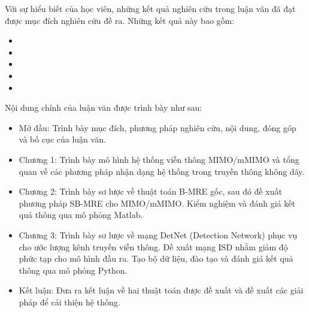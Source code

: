 
Với sự hiểu biết của học viên, những kết quả nghiên cứu trong luận văn đã đạt được mục đích nghiên cứu đề ra. Những kết quả này bao gồm:

\renewcommand{\labelitemi}{$-$}
\begin{itemize}
	\item 
	\item 
	\item 
	\item
	\item 
\end{itemize} 

\vspace{0.5cm}

Nội dung chính của luận văn được trình bày như sau:

\renewcommand{\labelitemi}{$-$}
\begin{itemize}
	\item Mở đầu: Trình bày mục đích, phương pháp nghiên cứu, nội dung, đóng góp và bố cục của luận văn.
	\item Chương 1: Trình bày mô hình hệ thống viễn thông MIMO/mMIMO và tổng quan về các phương pháp nhận dạng hệ thống trong truyền thông không dây.
	\item Chương 2: Trình bày sơ lược về thuật toán B-MRE gốc, sau đó đề xuất phương pháp SB-MRE cho MIMO/mMIMO. Kiểm nghiệm và đánh giá kết quả thông qua mô phỏng Matlab.
	\item Chương 3: Trình bày sơ lược về mạng DetNet (Detection Network) phục vụ cho ước lượng kênh truyền viễn thông. Đề xuất mạng ISD nhằm giảm độ phức tạp cho mô hình đầu ra. Tạo bộ dữ liệu, đào tạo và đánh giá kết quả thông qua mô phỏng Python.
	\item Kết luận: Đưa ra kết luận về hai thuật toán được đề xuất và đề xuất các giải pháp để cải thiện hệ thống.
\end{itemize} 